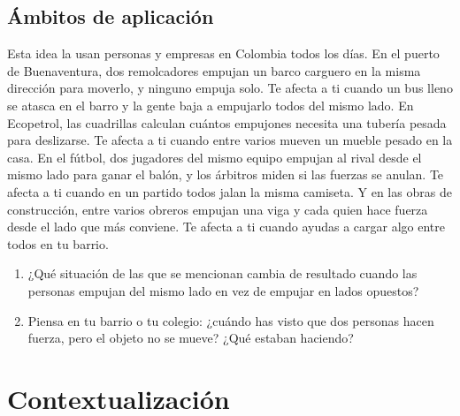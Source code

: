 \documentclass[
  spanish,
  letterpaper,
  12pt,
  oneside,
  open=any,
  DIV=15]{scrbook}
\providecommand{\tightlist}{%
  \setlength{\itemsep}{0pt}\setlength{\parskip}{0pt}}
\newcommand{\setcolorsection}[2]{%
  \definecolor{currentsectionbg}{HTML}{#1}%
  \definecolor{currentsectionborder}{HTML}{#2}%
}
\begin{document}
\subsection{Ámbitos de aplicación}\label{uxe1mbitos-de-aplicaciuxf3n-2}

Esta idea la usan personas y empresas en Colombia todos los días. En el
puerto de Buenaventura, dos remolcadores empujan un barco carguero en la
misma dirección para moverlo, y ninguno empuja solo. Te afecta a ti
cuando un bus lleno se atasca en el barro y la gente baja a empujarlo
todos del mismo lado. En Ecopetrol, las cuadrillas calculan cuántos
empujones necesita una tubería pesada para deslizarse. Te afecta a ti
cuando entre varios mueven un mueble pesado en la casa. En el fútbol,
dos jugadores del mismo equipo empujan al rival desde el mismo lado para
ganar el balón, y los árbitros miden si las fuerzas se anulan. Te afecta
a ti cuando en un partido todos jalan la misma camiseta. Y en las obras
de construcción, entre varios obreros empujan una viga y cada quien hace
fuerza desde el lado que más conviene. Te afecta a ti cuando ayudas a
cargar algo entre todos en tu barrio.

\begin{tcolorbox}[enhanced jigsaw, arc=.35mm, bottomrule=.15mm, bottomtitle=1mm, breakable, colback=white, colbacktitle=quarto-callout-note-color!10!white, colframe=quarto-callout-note-color-frame, coltitle=black, left=2mm, leftrule=.75mm, opacityback=0, opacitybacktitle=0.6, rightrule=.15mm, title=\textcolor{quarto-callout-note-color}{\faInfo}\hspace{0.5em}{Conexión con el Mundo Real}, titlerule=0mm, toprule=.15mm, toptitle=1mm]

\begin{enumerate}
\def\labelenumi{\arabic{enumi}.}
\tightlist
\item
  ¿Qué situación de las que se mencionan cambia de resultado cuando las
  personas empujan del mismo lado en vez de empujar en lados opuestos?
\item
  Piensa en tu barrio o tu colegio: ¿cuándo has visto que dos personas
  hacen fuerza, pero el objeto no se mueve? ¿Qué estaban haciendo?
\end{enumerate}

\end{tcolorbox}

\setcolorsection{f2c6a0}{e0b088}

\section{Contextualización}\label{contextualizaciuxf3n-2}
\end{document}
